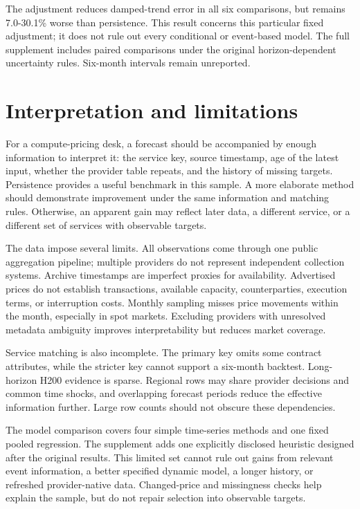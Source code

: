 \documentclass[10pt]{article}
\begin{document}
The adjustment reduces damped-trend error in all six comparisons, but remains 7.0-30.1\% worse than persistence. This result concerns this particular fixed adjustment; it does not rule out every conditional or event-based model. The full supplement includes paired comparisons under the original horizon-dependent uncertainty rules. Six-month intervals remain unreported.

\section{Interpretation and limitations}

For a compute-pricing desk, a forecast should be accompanied by enough information to interpret it: the service key, source timestamp, age of the latest input, whether the provider table repeats, and the history of missing targets. Persistence provides a useful benchmark in this sample. A more elaborate method should demonstrate improvement under the same information and matching rules. Otherwise, an apparent gain may reflect later data, a different service, or a different set of services with observable targets.

The data impose several limits. All observations come through one public aggregation pipeline; multiple providers do not represent independent collection systems. Archive timestamps are imperfect proxies for availability. Advertised prices do not establish transactions, available capacity, counterparties, execution terms, or interruption costs. Monthly sampling misses price movements within the month, especially in spot markets. Excluding providers with unresolved metadata ambiguity improves interpretability but reduces market coverage.

Service matching is also incomplete. The primary key omits some contract attributes, while the stricter key cannot support a six-month backtest. Long-horizon H200 evidence is sparse. Regional rows may share provider decisions and common time shocks, and overlapping forecast periods reduce the effective information further. Large row counts should not obscure these dependencies.

The model comparison covers four simple time-series methods and one fixed pooled regression. The supplement adds one explicitly disclosed heuristic designed after the original results. This limited set cannot rule out gains from relevant event information, a better specified dynamic model, a longer history, or refreshed provider-native data. Changed-price and missingness checks help explain the sample, but do not repair selection into observable targets.
\end{document}
